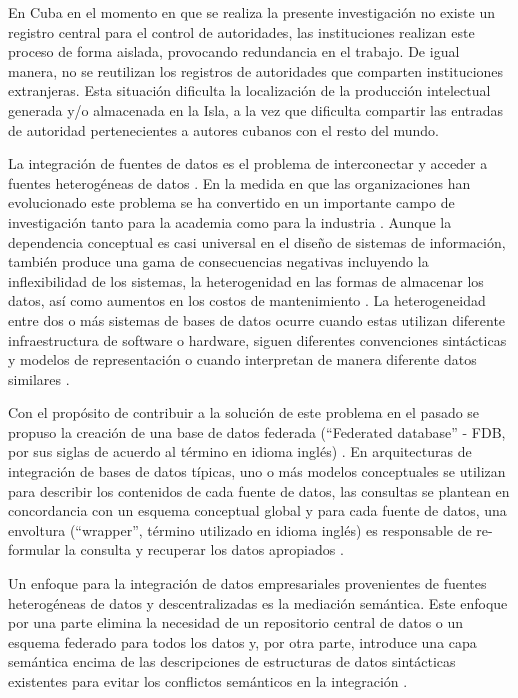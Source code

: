 En Cuba en el momento en que se realiza la presente investigación no existe un registro central para el control de autoridades, las instituciones realizan este proceso de forma aislada, provocando redundancia en el trabajo. De igual manera, no se reutilizan los registros de autoridades que comparten instituciones extranjeras. Esta situación dificulta la localización de la producción intelectual generada y/o almacenada en la Isla, a la vez que dificulta compartir las entradas de autoridad pertenecientes a autores cubanos con el resto del mundo.

La integración de fuentes de datos es el problema de interconectar y acceder a fuentes heterogéneas de datos \citep{Nachouki2011}. En la medida en que las organizaciones han evolucionado este problema se ha convertido en un importante campo de investigación tanto para la academia como para la industria \citep{Nachouki2011}. Aunque la dependencia conceptual es casi universal en el diseño de sistemas de información, también produce una gama de consecuencias negativas incluyendo la inflexibilidad de los sistemas, la heterogenidad en las formas de almacenar los datos, así como aumentos en los costos de mantenimiento \citep{McGinnes2015}. La heterogeneidad entre dos o más sistemas de bases de datos ocurre cuando estas utilizan diferente infraestructura de software o hardware, siguen diferentes convenciones sintácticas y modelos de representación o cuando interpretan de manera diferente datos similares \citep{Spanos2012}.

Con el propósito de contribuir a la solución de este problema en el pasado se propuso la creación de una base de datos federada (``Federated database'' - FDB, por sus siglas de acuerdo al término en idioma inglés) \citep{Sheth1990}. En arquitecturas de integración de bases de datos típicas, uno o más modelos conceptuales se utilizan para describir los contenidos de cada fuente de datos, las consultas se plantean en concordancia con un esquema conceptual global y para cada fuente de datos, una envoltura (``wrapper'', término utilizado en idioma inglés) es responsable de re-formular la consulta y recuperar los datos apropiados \citep{Spanos2012,Franke2014,ElKadiri2015}.

Un enfoque para la integración de datos empresariales provenientes de fuentes heterogéneas de datos y descentralizadas es la mediación semántica. Este enfoque por una parte elimina la necesidad de un repositorio central de datos o un esquema federado para todos los datos y, por otra parte, introduce una capa semántica encima de las descripciones de estructuras de datos sintácticas existentes para evitar los conflictos semánticos en la integración \citep{ElKadiri2015}. 

